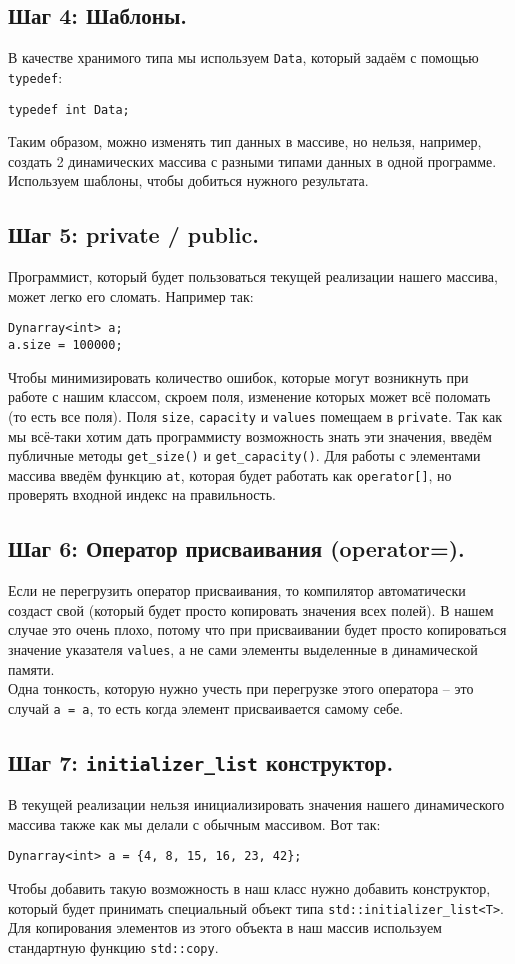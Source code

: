 \documentclass{article}
\begin{document}
\subsection*{Шаг 4: Шаблоны.}
В качестве хранимого типа мы используем \texttt{Data}, который задаём с помощью \texttt{typedef}:
\begin{lstlisting}
typedef int Data;
\end{lstlisting}
Таким образом, можно изменять тип данных в массиве, но нельзя, например, создать 2 динамических массива с разными типами данных в одной программе. Используем шаблоны, чтобы добиться нужного результата.\\
\subsection*{Шаг 5: private / public.}
Программист, который будет пользоваться текущей реализации нашего массива, может легко его сломать. Например так:
\begin{lstlisting}
Dynarray<int> a;
a.size = 100000;
\end{lstlisting}
Чтобы минимизировать количество ошибок, которые могут возникнуть при работе с нашим классом, скроем поля, изменение которых может всё поломать (то есть все поля). Поля \texttt{size}, \texttt{capacity} и \texttt{values} помещаем в \texttt{private}. Так как мы всё-таки хотим дать программисту возможность знать эти значения, введём публичные методы \texttt{get\_size()} и \texttt{get\_capacity()}. Для работы с элементами массива введём функцию \texttt{at}, которая будет работать как \texttt{operator[]}, но проверять входной индекс на правильность.

\subsection*{Шаг 6: Оператор присваивания (operator=).}
Если не перегрузить оператор присваивания, то компилятор автоматически создаст свой (который будет просто копировать значения всех полей). В нашем случае это очень плохо, потому что при присваивании будет просто копироваться значение указателя \texttt{values}, а не сами элементы выделенные в динамической памяти. \\
Одна тонкость, которую нужно учесть при перегрузке этого оператора -- это случай \texttt{a = a}, то есть когда элемент присваивается самому себе.

\subsection*{Шаг 7: \texttt{initializer\_list} конструктор.}
В текущей реализации нельзя инициализировать значения нашего динамического массива также как мы делали с обычным массивом. Вот так:
\begin{lstlisting}
Dynarray<int> a = {4, 8, 15, 16, 23, 42};
\end{lstlisting}
Чтобы добавить такую возможность в наш класс нужно добавить конструктор, который будет принимать специальный объект типа \texttt{std::initializer\_list<T>}. Для копирования элементов из этого объекта в наш массив используем стандартную функцию \texttt{std::copy}.
\end{document}
